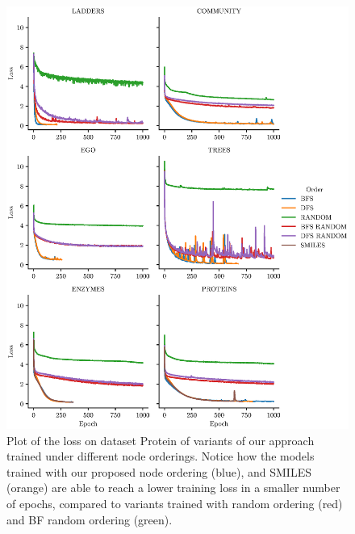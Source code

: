 \begin{figure}[h!]
\centering
\includegraphics[width=\textwidth]{Figures/Chapter6/loss.eps}
\caption{Plot of the loss on dataset Protein of variants of our approach trained under different node orderings. Notice how the models trained with our proposed node ordering (blue), and SMILES (orange) are able to reach a lower training loss in a smaller number of epochs, compared to variants trained with random ordering (red) and BF random ordering (green).}
\label{fig:loss}
\end{figure}

